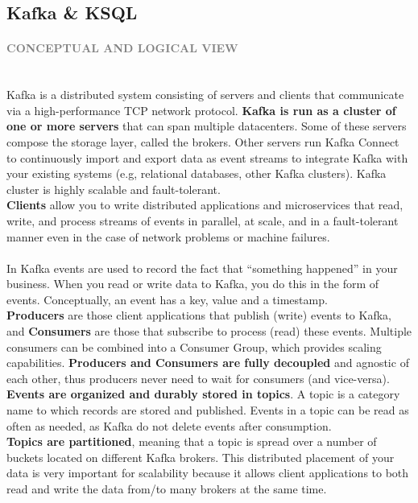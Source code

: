 \documentclass[10pt,a4paper]{article}
\newcommand{\nline}{\\~\\}
\newcommand{\myparagraph}[1]{\paragraph{\normalsize{\textcolor{gray}{\uppercase{\textbf{#1}}}} }\mbox{} \vspace{0.5em}\\}
\begin{document}
\subsection{Kafka \& KSQL}
\myparagraph{Conceptual and Logical View}
Kafka is a distributed system consisting of servers and clients that communicate via a high-performance TCP network protocol.
\textbf{Kafka is run as a cluster of one or more servers} that can span multiple datacenters. Some of these servers compose the storage layer, called the brokers. Other servers run Kafka Connect to continuously import and export data as event streams to integrate Kafka with your existing systems (e.g, relational databases, other Kafka clusters). Kafka cluster is highly scalable and fault-tolerant. \\
\textbf{Clients} allow you to write distributed applications and microservices that read, write, and process streams of events in parallel, at scale, and in a fault-tolerant manner even in the case of network problems or machine failures.
\nline
In Kafka events are used to record the fact that “something happened” in your business. When you read or write data to Kafka, you do this in the form of events. Conceptually, an event has a key, value and a timestamp. \\
\textbf{Producers} are those client applications that publish (write) events to Kafka, and \textbf{Consumers} are those that subscribe to process (read) these events. Multiple consumers can be combined into a Consumer Group, which provides scaling capabilities. \textbf{Producers and Consumers are fully decoupled} and agnostic of each other, thus producers never need to wait for consumers (and vice-versa). \\
\textbf{Events are organized and durably stored in topics}. A topic is a category name to which records are stored and published. Events in a topic can be read as often as needed, as Kafka do not delete events after consumption. \\
\textbf{Topics are partitioned}, meaning that a topic is spread over a number of buckets located on different Kafka brokers. This distributed placement of your data is very important for scalability because it allows client applications to both read and write the data from/to many brokers at the same time.
\end{document}
